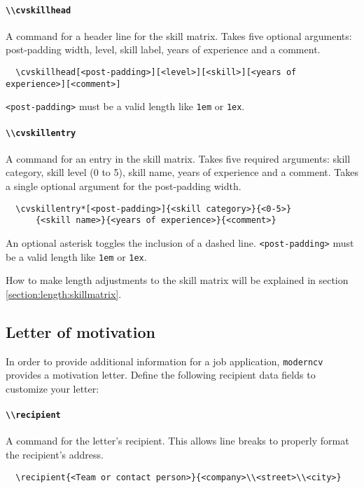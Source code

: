 \documentclass[a4paper, 11pt]{article}
\newcommand{\code}[1]{\lstinline!#1!}
\newcommand{\moderncv}{\code{moderncv}}
\begin{document}
\paragraph{\code{\\cvskillhead}}
A command for a header line for the skill matrix.
Takes five optional arguments: post-padding width, level, skill label, years of experience and a comment.
\begin{lstlisting}
  \cvskillhead[<post-padding>][<level>][<skill>][<years of experience>][<comment>]
\end{lstlisting}
\code{<post-padding>} must be a valid length like \code{1em} or \code{1ex}.

\paragraph{\code{\\cvskillentry}}
A command for an entry in the skill matrix.
Takes five required arguments: skill category, skill level (0 to 5), skill name, years of experience and a comment.
Takes a single optional argument for the post-padding width.
\begin{lstlisting}
  \cvskillentry*[<post-padding>]{<skill category>}{<0-5>}
      {<skill name>}{<years of experience>}{<comment>}
\end{lstlisting}
An optional asterisk toggles the inclusion of a dashed line.
\code{<post-padding>} must be a valid length like \code{1em} or \code{1ex}.

How to make length adjustments to the skill matrix will be explained in section \ref{section:length:skillmatrix}.

\subsection{Letter of motivation}

In order to provide additional information for a job application, {\moderncv} provides a motivation letter. Define the following recipient data fields to customize your letter:
\paragraph{\code{\\recipient}}
A command for the letter's recipient. This allows line breaks to properly format the recipient's address.
\begin{lstlisting}
  \recipient{<Team or contact person>}{<company>\\<street>\\<city>}
\end{lstlisting}
\end{document}
